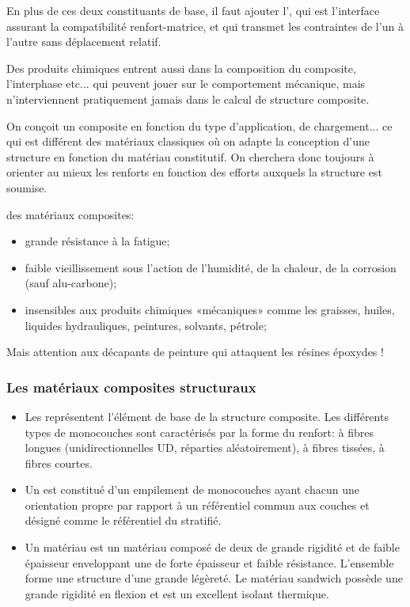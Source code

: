 \medskip
En plus de ces deux constituants de base, il faut ajouter l', qui est l'interface assurant la compatibilité renfort-matrice, et qui transmet les contraintes de l'un à l'autre sans  déplacement relatif.

\medskip
Des produits chimiques entrent aussi dans la composition du composite, l'interphase etc... qui peuvent jouer sur le comportement mécanique, mais n'interviennent pratiquement jamais dans le calcul de structure composite.

\medskip
\begin{remarque} On conçoit un composite en fonction du type d'application, de chargement... ce qui est différent des matériaux classiques où on adapte la conception d'une structure en fonction du matériau constitutif. On cherchera donc toujours à orienter au mieux les renforts en fonction des efforts auxquels la structure est soumise.\end{remarque}

\medskip
{} des matériaux composites:
\begin{itemize}
	\item grande résistance à la fatigue;
	\item faible vieillissement sous l'action de l'humidité, de la chaleur, de la corrosion (sauf alu-carbone);
	\item insensibles aux produits chimiques «mécaniques» comme les graisses, huiles, liquides hydrauliques, peintures, solvants, pétrole;
\end{itemize}
Mais attention aux décapants de peinture qui attaquent les résines époxydes !


\medskip
\subsubsection{Les matériaux composites structuraux}

\begin{itemize}
	\item Les  représentent l'élément de base de la structure composite. Les différents types de monocouches sont caractérisés par la forme du renfort:
		 à fibres longues (unidirectionnelles UD, réparties aléatoirement), à fibres tissées, à fibres courtes.
	\item Un  est constitué d'un empilement de monocouches ayant chacun une orientation propre par rapport à un référentiel commun aux couches et désigné comme le référentiel du stratifié.
	\item Un matériau  est un matériau composé de deux  de grande rigidité et de faible épaisseur enveloppant une  de forte épaisseur et faible résistance.
		L'ensemble forme une structure d'une grande légèreté.
		Le matériau sandwich possède une grande rigidité en flexion et est un excellent isolant thermique.
\end{itemize}

